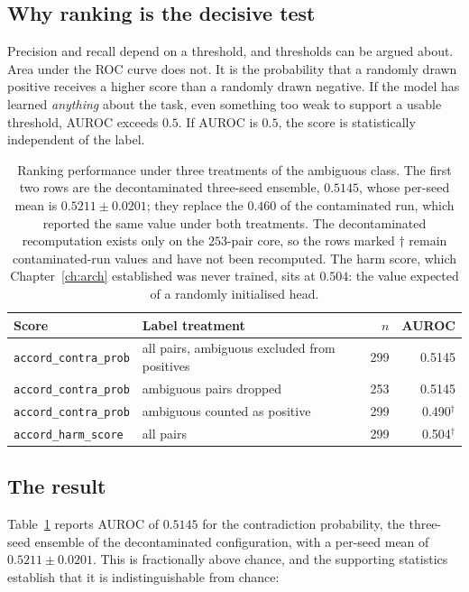 \subsection{Why ranking is the decisive test}

Precision and recall depend on a threshold, and thresholds can be argued about.
Area under the ROC curve does not. It is the probability that a randomly drawn
positive receives a higher score than a randomly drawn negative. If the model
has learned \emph{anything} about the task, even something too weak to support a
usable threshold, AUROC exceeds $0.5$. If AUROC is $0.5$, the score is
statistically independent of the label.

\begin{table}[t]
\centering
\small
\begin{tabular}{llrr}
\toprule
\textbf{Score} & \textbf{Label treatment} & \textbf{$n$} & \textbf{AUROC} \\
\midrule
\texttt{accord\_contra\_prob} & all pairs, ambiguous excluded from positives & 299 & 0.5145 \\
\texttt{accord\_contra\_prob} & ambiguous pairs dropped                       & 253 & 0.5145 \\
\texttt{accord\_contra\_prob} & ambiguous counted as positive                 & 299 & 0.490$^{\dagger}$ \\
\midrule
\texttt{accord\_harm\_score}  & all pairs                                     & 299 & 0.504$^{\dagger}$ \\
\bottomrule
\end{tabular}
\caption{Ranking performance under three treatments of the ambiguous class. The
first two rows are the decontaminated three-seed ensemble, $0.5145$, whose
per-seed mean is $0.5211 \pm 0.0201$; they replace the $0.460$ of the
contaminated run, which reported the same value under both treatments. The
decontaminated recomputation exists only on the $253$-pair core, so the rows
marked $\dagger$ remain contaminated-run values and have not been recomputed. The
harm score, which Chapter~\ref{ch:arch} established was never trained, sits at
$0.504$: the value expected of a randomly initialised head.}
\label{tab:auroc}
\end{table}

\subsection{The result}

Table~\ref{tab:auroc} reports AUROC of $0.5145$ for the contradiction
probability, the three-seed ensemble of the decontaminated configuration, with a
per-seed mean of $0.5211 \pm 0.0201$. This is fractionally above chance, and the
supporting statistics establish that it is indistinguishable from chance:

